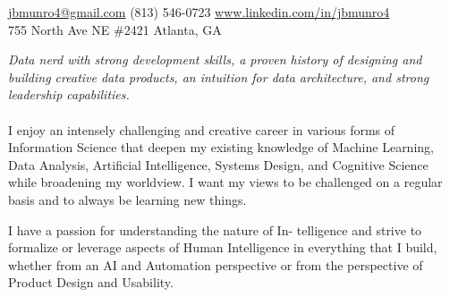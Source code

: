 \documentclass[10pt,a4paper]{article}
\begin{document}
\sloppy  %



\nobreakvspace{0.3em}  %

\noindent\href{mailto:jbmunro4.at.gmail.dot.com}{jbmunro4\mbox{}@\mbox{}gmail.com}\sbull
\textsmaller(813) 546-0723\sbull
\href{http://www.linkedin.com/in/jbmunro4}{www.linkedin.com/in/jbmunro4}
\\
755 North Ave NE \#2421\sbull
Atlanta, GA

\spacedhrule{0.9em}{-0.4em}  %


\vspace{-1.3em}  %
\begin{multicols}{2}  %
\noindent \emph{Data nerd with strong development skills, a proven history of designing and building creative data products, an intuition for data architecture, and strong leadership capabilities.}
\\
\\
I enjoy an intensely challenging and creative career in various forms of Information Science that deepen my existing knowledge of Machine Learning, Data Analysis, Artificial Intelligence, Systems Design, and Cognitive Science while broadening my worldview. I want my views to be challenged on a regular basis and to always be learning new things.

I have a passion for understanding the nature of In- telligence and strive to formalize or leverage aspects of Human Intelligence in everything that I build, whether from an AI and Automation perspective or from the perspective of Product Design and Usability.
\end{multicols}


\spacedhrule{0em}{-0.4em}

\end{document}
